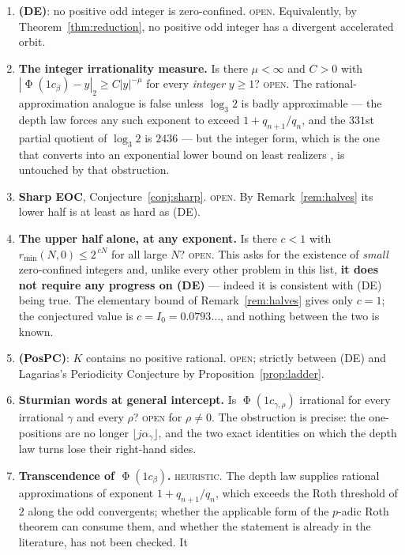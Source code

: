 \documentclass[11pt,reqno]{amsart}
\theoremstyle{plain}
\theoremstyle{definition}
\DeclareMathOperator{\Ph}{\Phi}
\newcommand{\lab}[1]{\textnormal{\textsc{\small #1}}}
\begin{document}
\begin{enumerate}
\item \textbf{(DE)}: no positive odd integer is zero-confined. \lab{open}.
Equivalently, by Theorem~\ref{thm:reduction}, no positive odd integer has a
divergent accelerated orbit.
\item \textbf{The integer irrationality measure.} Is there $\mu<\infty$ and $C>0$
with $|\Ph(1c_\beta)-y|_2\ge C|y|^{-\mu}$ for every \emph{integer} $y\ge1$?
\lab{open}. The rational-approximation analogue is false unless $\log_3 2$ is
badly approximable --- the depth law forces any such exponent to exceed
$1+q_{n+1}/q_n$, and the $331$st partial quotient of $\log_3 2$ is $2436$ --- but
the integer form, which is the one that converts into an exponential lower bound
on least realizers \cite[Thm.~5.2]{DeJesusB}, is untouched by that obstruction.
\item \textbf{Sharp EOC}, Conjecture~\ref{conj:sharp}. \lab{open}. By
Remark~\ref{rem:halves} its lower half is at least as hard as \textup{(DE)}.
\item \textbf{The upper half alone, at any exponent.} Is there $c<1$ with
$r_{\min}(N,0)\le 2^{\,cN}$ for all large $N$? \lab{open}. This asks for the
existence of \emph{small} zero-confined integers and, unlike every other problem
in this list, \textbf{it does not require any progress on \textup{(DE)}} ---
indeed it is consistent with \textup{(DE)} being true. The elementary bound of
Remark~\ref{rem:halves} gives only $c=1$; the conjectured value is
$c=I_0=0.0793\ldots$, and nothing between the two is known.
\item \textbf{(PosPC)}: $K$ contains no positive rational.
\lab{open}; strictly between (DE) and Lagarias's Periodicity Conjecture by
Proposition~\ref{prop:ladder}.
\item \textbf{Sturmian words at general intercept.} Is $\Ph(1c_{\gamma,\rho})$
irrational for every irrational $\gamma$ and every $\rho$? \lab{open} for
$\rho\ne0$. The obstruction is precise: the one-positions are no longer
$\lfloor j\alpha_\gamma\rfloor$, and the two exact identities on which the depth
law turns lose their right-hand sides.
\item \textbf{Transcendence of $\Ph(1c_\beta)$.} \lab{heuristic}. The depth law
supplies rational approximations of exponent $1+q_{n+1}/q_n$, which exceeds the
Roth threshold of $2$ along the odd convergents; whether the applicable form of
the $p$-adic Roth theorem \cite{Ridout1958,KalitzinMurru2026} can consume them,
and whether the statement is already in the literature, has not been checked. It

\end{enumerate}
\end{document}
